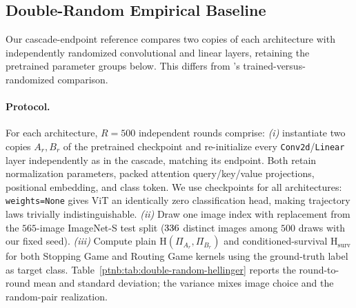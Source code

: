 

\subsection{Double-Random Empirical Baseline}\label{ptnb:sec:lmp-rand-double-random}

Our cascade-endpoint reference compares two copies of each architecture with independently randomized convolutional and linear layers, retaining the pretrained parameter groups below. This differs from \textcite{Adebayo2018sanity}'s trained-versus-randomized comparison.

\paragraph{Protocol.}
For each architecture, $R = 500$ independent rounds comprise: \emph{(i)} instantiate two copies $A_r, B_r$ of the pretrained checkpoint and re-initialize every \texttt{Conv2d}/\texttt{Linear} layer independently as in the cascade, matching its endpoint. Both retain normalization parameters, packed attention query/key/value projections, positional embedding, and class token. We use checkpoints for all architectures: \texttt{weights=None} gives ViT an identically zero classification head, making trajectory laws trivially indistinguishable. \emph{(ii)} Draw one image index with replacement from the $565$-image ImageNet-S test split ($336$ distinct images among $500$ draws with our fixed seed). \emph{(iii)} Compute plain $\mathrm{H}(\Pi_{A_r}, \Pi_{B_r})$ and conditioned-survival $\mathrm{H}_{\mathrm{surv}}$ for both Stopping Game and Routing Game kernels using the ground-truth label as target class. Table~\ref{ptnb:tab:double-random-hellinger} reports the round-to-round mean and standard deviation; the variance mixes image choice and the random-pair realization.

\begin{table}[H]
\TableContent{
    \centering
    \small
    
    }%
\caption[Hellinger trajectory distance at the double-random baseline]{Double-random Hellinger distances, mean $\pm$ standard deviation over $R=500$ rounds. Each round pairs independently randomized copies of the architecture on one sampled ImageNet-S test image, retaining the pretrained parameter groups specified above.}
    \label{ptnb:tab:double-random-hellinger}
\end{table}

